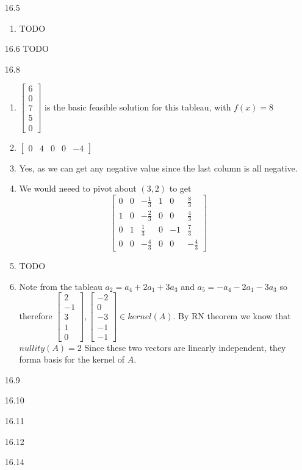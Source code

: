 \documentclass[10pt,a4paper]{article}
\newcommand\m[1]{\begin{bmatrix}#1\end{bmatrix}}
\begin{document}
\begin{enumerate}
    \item [16.5] \begin{enumerate}
        \item TODO
    \end{enumerate}
    \item [16.6] TODO
    \item [16.8] \begin{enumerate}
        \item $\m{6 \\ 0 \\7 \\ 5\\0 }$ is the basic feasible solution for this tableau, with $f(x) = 8$
        \item $\m{ 0 & 4 & 0 &0 &-4}$
        \item Yes, as we can get any negative value since the last column is all negative.
        \item We would neeed to pivot about $(3,2)$ to get
        $$\m{0 & 0 & -\frac{1}{3} & 1 & 0 & \frac{8}{3} \\ 
             1 & 0 & -\frac{2}{3} & 0 & 0 & \frac{4}{3} \\
             0 & 1 & \frac{1}{3} & 0 & -1 & \frac{7}{3} \\
             0 & 0 & -\frac{4}{3} & 0 & 0 & -\frac{4}{3}
        }$$
        \item TODO 
        \item Note from the tableau $a_2 = a_4 + 2a_1 + 3a_3$ and $ a_5 = -a_4 -2a_1  - 3a_3$ so therefore 
        $\m{2 \\ -1 \\ 3\\1\\0}, \m{-2 \\ 0 \\-3 \\-1\\-1} \in kernel(A)$. By RN theorem we know that $nullity(A) = 2$
        Since these two vectors are linearly independent, they forma  basis for the kernel of $A$.
    \end{enumerate}

    \item [16.9]
    \item [16.10]
    \item [16.11]
    \item [16.12]
    \item [16.14]
\end{enumerate}
\end{document}
